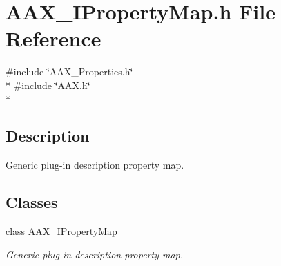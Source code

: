 \hypertarget{a00260}{}\section{A\+A\+X\+\_\+\+I\+Property\+Map.\+h File Reference}
\label{a00260}
{\ttfamily \#include \char`\"{}A\+A\+X\+\_\+\+Properties.\+h\char`\"{}}\\*
{\ttfamily \#include \char`\"{}A\+A\+X.\+h\char`\"{}}\\*


\subsection{Description}
Generic plug-\/in description property map. 

\subsection*{Classes}
\begin{DoxyCompactItemize}
\item 
class \hyperlink{a00112}{A\+A\+X\+\_\+\+I\+Property\+Map}
\begin{DoxyCompactList}\small\item\em Generic plug-\/in description property map. \end{DoxyCompactList}\end{DoxyCompactItemize}
